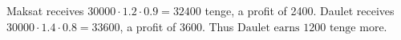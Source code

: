 Maksat receives $30000\cdot1.2\cdot0.9=32400$ tenge, a profit of 2400. Daulet receives $30000\cdot1.4\cdot0.8=33600$, a profit of 3600. Thus $\boxed{\text{Daulet earns 1200 tenge more}}$.
